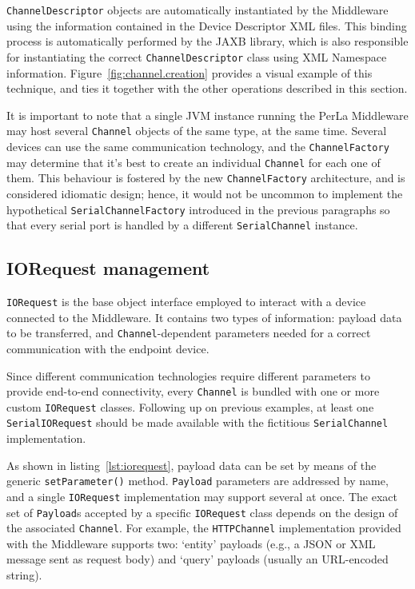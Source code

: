 \texttt{ChannelDescriptor} objects are automatically instantiated by the Middleware using the information contained in the Device Descriptor XML files. This binding process is automatically performed by the JAXB library, which is also responsible for instantiating the correct \texttt{ChannelDescriptor} class using XML Namespace information. Figure~\ref{fig:channel.creation} provides a visual example of this technique, and ties it together with the other operations described in this section.

It is important to note that a single JVM instance running the PerLa Middleware may host several \texttt{Channel} objects of the same type, at the same time. Several devices can use the same communication technology, and the \texttt{ChannelFactory} may determine that it's best to create an individual \texttt{Channel} for each one of them. This behaviour is fostered by the new \texttt{ChannelFactory} architecture, and is considered idiomatic design; hence, it would not be uncommon to implement the hypothetical \texttt{SerialChannelFactory} introduced in the previous paragraphs so that every serial port is handled by a different \texttt{SerialChannel} instance.


\subsection{IORequest management}

\texttt{IORequest} is the base object interface employed to interact with a device connected to the Middleware. It contains two types of information: payload data to be transferred, and \texttt{Channel}-dependent parameters needed for a correct communication with the endpoint device.

Since different communication technologies require different parameters to provide end-to-end connectivity, every \texttt{Channel} is bundled with one or more custom \texttt{IORequest} classes. Following up on previous examples, at least one \texttt{SerialIORequest} should be made available with the fictitious \texttt{SerialChannel} implementation.

As shown in listing~\ref{lst:iorequest}, payload data can be set by means of the generic \texttt{setParameter()} method. \texttt{Payload} parameters are addressed by name, and a single \texttt{IORequest} implementation may support several at once. The exact set of \texttt{Payload}s accepted by a specific \texttt{IORequest} class depends on the design of the associated \texttt{Channel}. For example, the \texttt{HTTPChannel} implementation provided with the Middleware supports two: `entity' payloads (e.g., a JSON or XML message sent as request body) and `query' payloads (usually an URL-encoded string).

